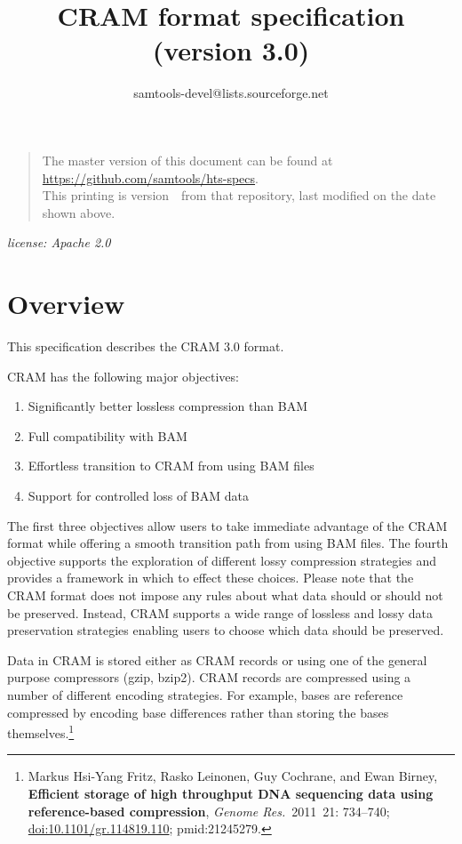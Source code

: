 \documentclass[a4paper]{article}
\begin{document}

\title{CRAM format specification (version 3.0)}
\author{samtools-devel@lists.sourceforge.net}
\date{\headdate}
\maketitle


\begin{quote}\small
The master version of this document can be found at
\url{https://github.com/samtools/hts-specs}.\\
This printing is version~\commitdesc\ from that repository,
last modified on the date shown above.
\end{quote}

\begin{center}
\textit{license: Apache 2.0}
\end{center}
\vspace*{1em}

\section{\textbf{Overview}}

This specification describes the CRAM 3.0 format. 

CRAM has the following major objectives:

\begin{enumerate}
\item Significantly better lossless compression than BAM

\item Full compatibility with BAM

\item Effortless transition to CRAM from using BAM files

\item Support for controlled loss of BAM data
\end{enumerate}

The first three objectives allow users to take immediate advantage of the CRAM 
format while offering a smooth transition path from using BAM files. The fourth 
objective supports the exploration of different lossy compression strategies and 
provides a framework in which to effect these choices. Please note that the CRAM 
format does not impose any rules about what data should or should not be preserved. 
Instead, CRAM supports a wide range of lossless and lossy data preservation strategies 
enabling users to choose which data should be preserved.

Data in CRAM is stored either as CRAM records or using one of the general purpose 
compressors (gzip, bzip2). CRAM records are compressed using a number of different 
encoding strategies. For example, bases are reference compressed by encoding base
differences rather than storing the bases themselves.\footnote{Markus Hsi-Yang Fritz,
Rasko Leinonen, Guy Cochrane, and Ewan Birney,
\textbf{Efficient storage of high throughput DNA sequencing data using reference-based compression},
{\sl Genome Res.}~2011~21: 734--740;
\href{http://dx.doi.org/doi:10.1101/gr.114819.110}{doi:10.1101/gr.114819.110};
{\sc pmid:}21245279.}
\end{document}
